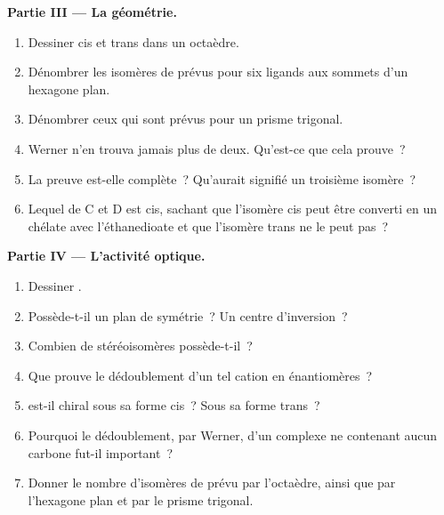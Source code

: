 \begin{problem}
\medskip
\noindent\textbf{Partie III --- La géométrie.}
\begin{enumerate}[resume]
  \item Dessiner \ce{[CoCl2(NH3)4]+} cis et trans dans un octaèdre.
  \item Dénombrer les isomères de \ce{[CoCl2(NH3)4]+} prévus pour six ligands aux
        sommets d'un hexagone plan.
  \item Dénombrer ceux qui sont prévus pour un prisme trigonal.
  \item Werner n'en trouva jamais plus de deux. Qu'est-ce que cela prouve~?
  \item La preuve est-elle complète~? Qu'aurait signifié un troisième isomère~?
  \item Lequel de C et D est cis, sachant que l'isomère cis peut être converti en un
        chélate avec l'éthanedioate et que l'isomère trans ne le peut pas~?
\end{enumerate}

\medskip
\noindent\textbf{Partie IV --- L'activité optique.}
\begin{enumerate}[resume]
  \item Dessiner .
  \item Possède-t-il un plan de symétrie~? Un centre d'inversion~?
  \item Combien de stéréoisomères possède-t-il~?
  \item Que prouve le dédoublement d'un tel cation en énantiomères~?
  \item \ce{[CoCl2(en)2]+} est-il chiral sous sa forme cis~? Sous sa forme trans~?
  \item Pourquoi le dédoublement, par Werner, d'un complexe ne contenant aucun carbone fut-il important~?
  \item Donner le nombre d'isomères de \ce{[CoCl2(NH3)4]+} prévu par l'octaèdre,
        ainsi que par l'hexagone plan et par le prisme trigonal.
\end{enumerate}
\end{problem}
